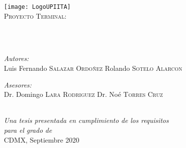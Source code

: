 \documentclass[
	12pt, %
	spanish, %
	es-tabla,
	singlespacing, %
	headsepline, %
	]{MastersDoctoralThesis} %
\author{} %
\begin{document}
%
\frontmatter %

\pagestyle{plain} %


\begin{titlepage}
\begin{center}

{\scshape\LARGE \univname\par}\vspace{1cm} %
\texttt{[image: LogoUPIITA]}\\ %
\vspace*{.03\textheight}
\textsc{\Large Proyecto Terminal:}\\[0.5cm] %

\HRule \\[0.3cm] %
{\huge \bfseries \ttitle\par}\vspace{0.4cm} %
\HRule \\[0.3cm] %

\begin{minipage}[t]{0.45\textwidth}
\begin{flushleft} \large
\emph{Autores:}\\
Luis Fernando \textsc{Salazar Ordoñez} \newline
Rolando \textsc{Sotelo Alarcon} \newline
\end{flushleft}
\end{minipage}
\begin{minipage}[t]{0.45\textwidth}
\begin{flushright} \large
\emph{Asesores:} \\
Dr. Domingo \textsc{Lara Rodriguez} \newline
Dr. Noé \textsc{Torres Cruz}
\end{flushright}
\end{minipage}\\[.1cm]
\vfill
\large \textit{Una tesis presentada en cumplimiento de los requisitos \\para el grado de \degreename}\\[0.2cm] %
\vfill
{\large CDMX, Septiembre 2020}\\[4cm] %
\vfill
\end{center}
\end{titlepage}
\end{document}

